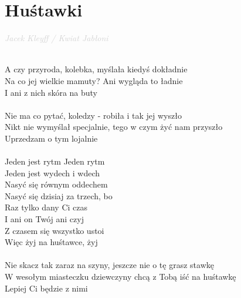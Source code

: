 \documentclass[a5paper, 10pt]{book}
\begin{document}
\section{Huśtawki}\textcolor{lightgray}{\textit{Jacek Kleyff / Kwiat Jabłoni}}\\~\\
\begin{minipage}[t]{0.8\textwidth}
A czy przyroda, kolebka, myślała kiedyś dokładnie\\
Na co jej wielkie mamuty? Ani wygląda to ładnie\\
I ani z nich skóra na buty\\
\\
Nie ma co pytać, koledzy - robiła i tak jej wyszło\\
Nikt nie wymyślał specjalnie, tego w czym żyć nam przyszło\\
Uprzedzam o tym lojalnie\\
\\
\hspace*{5mm}Jeden jest rytm Jeden rytm\\
\hspace*{5mm}Jeden jest wydech i wdech\\
\hspace*{5mm}Nasyć się równym oddechem\\
\hspace*{5mm}Nasyć się dzisiaj za trzech, bo\\
\hspace*{5mm}Raz tylko dany Ci czas\\
\hspace*{5mm}I ani on Twój ani czyj\\
\hspace*{5mm}Z czasem się wszystko ustoi\\
\hspace*{5mm}Więc żyj na huśtawce, żyj\\
\\
Nie skacz tak zaraz na szyny, jeszcze nie o tę grasz stawkę\\
W wesołym miasteczku dziewczyny chcą z Tobą iść na huśtawkę\\
Lepiej Ci będzie z nimi\\


\end{minipage}
\end{document}
